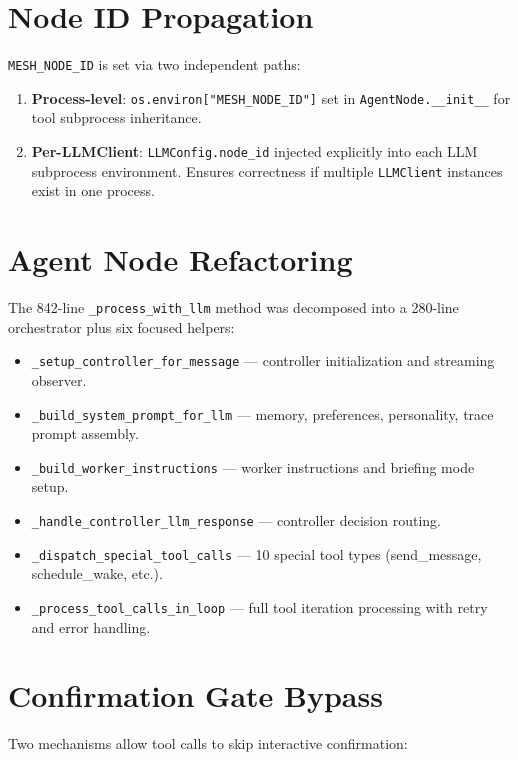\documentclass[11pt,letterpaper]{report}
\newcommand{\code}[1]{\texttt{#1}}
\begin{document}
\section{Node ID Propagation}

\code{MESH\_NODE\_ID} is set via two independent paths:
\begin{enumerate}[nosep]
  \item \textbf{Process-level}: \code{os.environ["MESH\_NODE\_ID"]}
        set in \code{AgentNode.\_\_init\_\_} for tool subprocess
        inheritance.
  \item \textbf{Per-LLMClient}: \code{LLMConfig.node\_id} injected
        explicitly into each LLM subprocess environment. Ensures
        correctness if multiple \code{LLMClient} instances exist in one
        process.
\end{enumerate}

\section{Agent Node Refactoring}

The 842-line \code{\_process\_with\_llm} method was decomposed into a
280-line orchestrator plus six focused helpers:

\begin{itemize}[nosep]
  \item \code{\_setup\_controller\_for\_message} --- controller
        initialization and streaming observer.
  \item \code{\_build\_system\_prompt\_for\_llm} --- memory, preferences,
        personality, trace prompt assembly.
  \item \code{\_build\_worker\_instructions} --- worker instructions and
        briefing mode setup.
  \item \code{\_handle\_controller\_llm\_response} --- controller
        decision routing.
  \item \code{\_dispatch\_special\_tool\_calls} --- 10 special tool types
        (send\_message, schedule\_wake, etc.).
  \item \code{\_process\_tool\_calls\_in\_loop} --- full tool iteration
        processing with retry and error handling.
\end{itemize}

\section{Confirmation Gate Bypass}

Two mechanisms allow tool calls to skip interactive confirmation:
\end{document}

